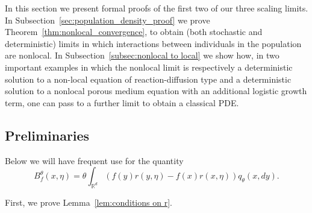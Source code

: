 \documentclass[EJP]{ejpecp} %
\newcommand{\IR}{\mathbb R}
\begin{document}
In this section we present formal proofs of the first two of our
three scaling limits.
In Subsection~\ref{sec:population_density_proof} 
we prove Theorem~\ref{thm:nonlocal_convergence}, to obtain (both
stochastic and deterministic) limits in
which interactions between individuals in the population are nonlocal.
In Subsection~\ref{subsec:nonlocal to local}
we show how, in two important examples in which the nonlocal
limit is respectively a deterministic solution to a non-local equation of 
reaction-diffusion type and a deterministic solution to a nonlocal 
porous medium equation with an additional logistic growth term, 
one can pass to a further 
limit to obtain a classical PDE.


\subsection{Preliminaries}
\label{sec:preliminary_proofs}

Below we will have frequent use for the quantity
\begin{equation}
\label{generator Bf}
    B^\theta_f(x, \eta) = \theta \int_{\IR^d} (f(y) r(y, \eta) - f(x) r(x, \eta)) q_\theta(x, dy) .
\end{equation}

First, we prove Lemma~\ref{lem:conditions on r}.
\end{document}
